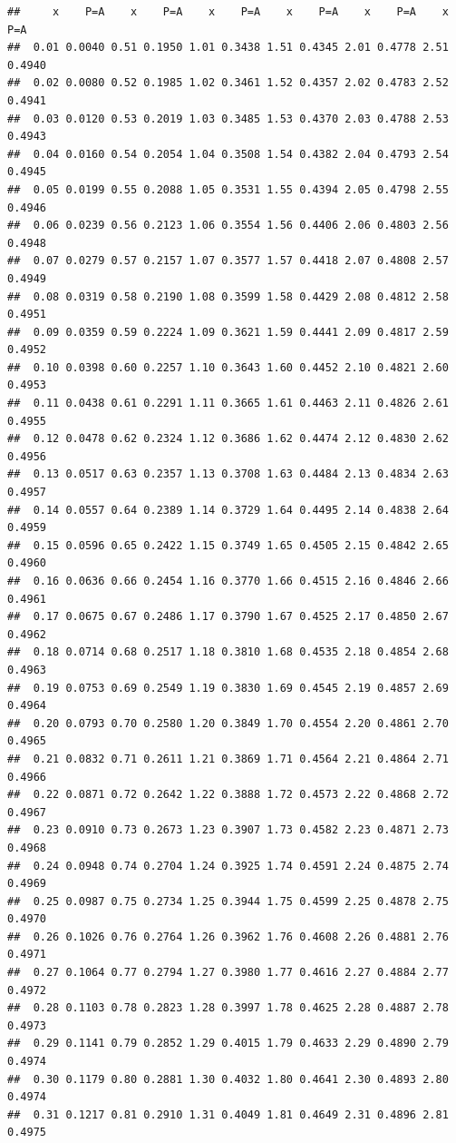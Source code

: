 \documentclass[onecolumn,12pt]{book}\usepackage[]{graphicx}\usepackage[]{color}
\makeatletter
\newenvironment{kframe}{%
 \def\at@end@of@kframe{}%
 \ifinner\ifhmode%
  \def\at@end@of@kframe{\end{minipage}}%
  \begin{minipage}{\columnwidth}%
 \fi\fi%
 \def\FrameCommand##1{\hskip\@totalleftmargin \hskip-\fboxsep
 \colorbox{shadecolor}{##1}\hskip-\fboxsep
     \hskip-\linewidth \hskip-\@totalleftmargin \hskip\columnwidth}%
 \MakeFramed {\advance\hsize-\width
   \@totalleftmargin\z@ \linewidth\hsize
   \@setminipage}}%
 {\par\unskip\endMakeFramed%
 \at@end@of@kframe}
\newenvironment{knitrout}{}{} %
\makeatother
\begin{document}
\begin{knitrout}
\color{fgcolor}\begin{kframe}
\begin{verbatim}
##     x    P=A    x    P=A    x    P=A    x    P=A    x    P=A    x    P=A
##  0.01 0.0040 0.51 0.1950 1.01 0.3438 1.51 0.4345 2.01 0.4778 2.51 0.4940
##  0.02 0.0080 0.52 0.1985 1.02 0.3461 1.52 0.4357 2.02 0.4783 2.52 0.4941
##  0.03 0.0120 0.53 0.2019 1.03 0.3485 1.53 0.4370 2.03 0.4788 2.53 0.4943
##  0.04 0.0160 0.54 0.2054 1.04 0.3508 1.54 0.4382 2.04 0.4793 2.54 0.4945
##  0.05 0.0199 0.55 0.2088 1.05 0.3531 1.55 0.4394 2.05 0.4798 2.55 0.4946
##  0.06 0.0239 0.56 0.2123 1.06 0.3554 1.56 0.4406 2.06 0.4803 2.56 0.4948
##  0.07 0.0279 0.57 0.2157 1.07 0.3577 1.57 0.4418 2.07 0.4808 2.57 0.4949
##  0.08 0.0319 0.58 0.2190 1.08 0.3599 1.58 0.4429 2.08 0.4812 2.58 0.4951
##  0.09 0.0359 0.59 0.2224 1.09 0.3621 1.59 0.4441 2.09 0.4817 2.59 0.4952
##  0.10 0.0398 0.60 0.2257 1.10 0.3643 1.60 0.4452 2.10 0.4821 2.60 0.4953
##  0.11 0.0438 0.61 0.2291 1.11 0.3665 1.61 0.4463 2.11 0.4826 2.61 0.4955
##  0.12 0.0478 0.62 0.2324 1.12 0.3686 1.62 0.4474 2.12 0.4830 2.62 0.4956
##  0.13 0.0517 0.63 0.2357 1.13 0.3708 1.63 0.4484 2.13 0.4834 2.63 0.4957
##  0.14 0.0557 0.64 0.2389 1.14 0.3729 1.64 0.4495 2.14 0.4838 2.64 0.4959
##  0.15 0.0596 0.65 0.2422 1.15 0.3749 1.65 0.4505 2.15 0.4842 2.65 0.4960
##  0.16 0.0636 0.66 0.2454 1.16 0.3770 1.66 0.4515 2.16 0.4846 2.66 0.4961
##  0.17 0.0675 0.67 0.2486 1.17 0.3790 1.67 0.4525 2.17 0.4850 2.67 0.4962
##  0.18 0.0714 0.68 0.2517 1.18 0.3810 1.68 0.4535 2.18 0.4854 2.68 0.4963
##  0.19 0.0753 0.69 0.2549 1.19 0.3830 1.69 0.4545 2.19 0.4857 2.69 0.4964
##  0.20 0.0793 0.70 0.2580 1.20 0.3849 1.70 0.4554 2.20 0.4861 2.70 0.4965
##  0.21 0.0832 0.71 0.2611 1.21 0.3869 1.71 0.4564 2.21 0.4864 2.71 0.4966
##  0.22 0.0871 0.72 0.2642 1.22 0.3888 1.72 0.4573 2.22 0.4868 2.72 0.4967
##  0.23 0.0910 0.73 0.2673 1.23 0.3907 1.73 0.4582 2.23 0.4871 2.73 0.4968
##  0.24 0.0948 0.74 0.2704 1.24 0.3925 1.74 0.4591 2.24 0.4875 2.74 0.4969
##  0.25 0.0987 0.75 0.2734 1.25 0.3944 1.75 0.4599 2.25 0.4878 2.75 0.4970
##  0.26 0.1026 0.76 0.2764 1.26 0.3962 1.76 0.4608 2.26 0.4881 2.76 0.4971
##  0.27 0.1064 0.77 0.2794 1.27 0.3980 1.77 0.4616 2.27 0.4884 2.77 0.4972
##  0.28 0.1103 0.78 0.2823 1.28 0.3997 1.78 0.4625 2.28 0.4887 2.78 0.4973
##  0.29 0.1141 0.79 0.2852 1.29 0.4015 1.79 0.4633 2.29 0.4890 2.79 0.4974
##  0.30 0.1179 0.80 0.2881 1.30 0.4032 1.80 0.4641 2.30 0.4893 2.80 0.4974
##  0.31 0.1217 0.81 0.2910 1.31 0.4049 1.81 0.4649 2.31 0.4896 2.81 0.4975

\end{verbatim}
\end{kframe}
\end{knitrout}
\end{document}
